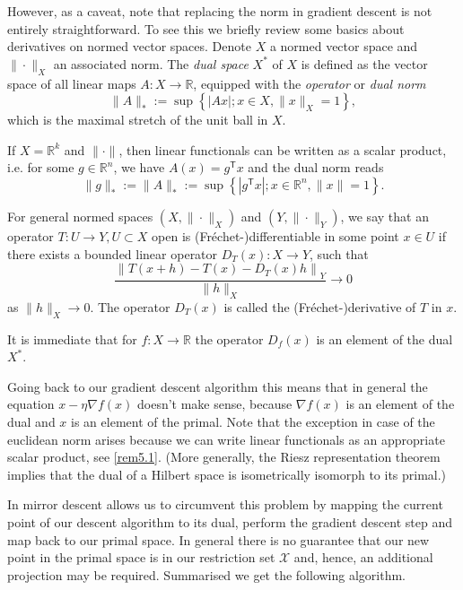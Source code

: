 However, as a caveat, note that replacing the norm in gradient descent is not entirely straightforward. To see this we briefly review some basics about derivatives on normed vector spaces. Denote $X$ a normed vector space and $\|\cdot \|_X$ an associated norm. The \emph{dual space} $X^*$ of $X$ is defined as the vector space of all linear maps $A\colon X\rightarrow \mathbb{R}$, equipped with the \emph{operator} or \emph{dual norm}
\begin{equation*}
	\|A\|_* := \sup\left\{|Ax|; x\in X, \|x\|_X = 1 \right\},
\end{equation*}
which is the maximal stretch of the unit ball in $X$.
\begin{remark}\label{rem5.1}
If $X = \mathbb{R}^k$ and $\|\cdot\|$, then linear functionals can be written as a scalar product, i.e. for some $g\in \mathbb{R}^n$, we have $A(x) = g^\mathsf{T}x$ and the dual norm reads
\begin{equation*}
	\|g\|_* := \|A\|_* :=  \sup\left\{|g^\mathsf{T}x|; x\in \mathbb{R}^n, \|x\| = 1 \right\}.
\end{equation*}
\end{remark}
\begin{definition}
For general normed spaces $(X, \|\cdot\|_X)$ and $(Y,\|\cdot\|_Y)$, we say that an operator $T\colon U \rightarrow Y, U\subset X$ open is (Fréchet-)differentiable in some point $x \in U$ if there exists a bounded linear operator $D_T(x)\colon X \rightarrow Y$, such that
\begin{equation*}
	\frac{\left\|T(x + h) - T(x) - D_T(x)h\right\|_Y}{\|h\|_X} \rightarrow 0
\end{equation*}
as $\|h\|_X \rightarrow 0$. The operator $D_T(x)$ is called the (Fréchet-)derivative of $T$ in $x$.
\end{definition}
It is immediate that for $f\colon X \rightarrow \mathbb{R}$ the operator $D_f(x)$ is an element of the dual $X^*$.

Going back to our gradient descent algorithm this means that in general the equation $x - \eta \nabla f(x)$ doesn't make sense, because $\nabla f(x)$ is an element of the dual and $x$ is an element of the primal.
Note that the exception in case of the euclidean norm arises because we can write linear functionals as an appropriate scalar product, see \autoref{rem5.1}. (More generally, the Riesz representation theorem implies that the dual of a Hilbert space is isometrically isomorph to its primal.)

In mirror descent allows us to circumvent this problem by mapping the current point of our descent algorithm to its dual, perform the gradient descent step and map back to our primal space. In general there is no guarantee that our new point in the primal space is in our restriction set $\mathcal{X}$ and, hence, an additional projection may be required. Summarised we get the following algorithm.

